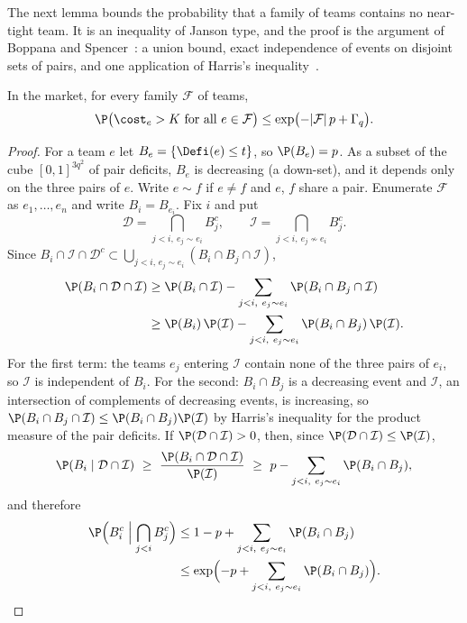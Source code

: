 The next lemma bounds the probability that a family of teams contains no near-tight team. It
is an inequality of Janson type, and the proof is the argument of Boppana and
Spencer~\cite{BoppanaSpencer89}: a union bound, exact independence of events on disjoint sets
of pairs, and one application of Harris's inequality~\cite{Harris60}.

\begin{lemma}\label{lem:transfer-void}
In the market, for every family $\mathcal F$ of teams,
\[
\P\bigl(\cost_e>K\ \text{for all }e\in\mathcal F\bigr)\le\exp\bigl(-|\mathcal F|\,p+\Gamma_q\bigr).
\]
\end{lemma}

\begin{proof}
For a team $e$ let $B_e=\{\Defi(e)\le t\}$, so $\P(B_e)=p$. As a subset of the cube
$[0,1]^{3q^2}$ of pair deficits, $B_e$ is decreasing (a down-set), and it depends only on the
three pairs of $e$. Write $e\sim f$ if $e\ne f$ and $e$, $f$ share a pair. Enumerate
$\mathcal F$ as $e_1,\dots,e_n$ and write $B_i=B_{e_i}$. Fix $i$ and put
\[
\mathcal D=\bigcap_{j<i,\ e_j\sim e_i}B_j^{c},\qquad
\mathcal I=\bigcap_{j<i,\ e_j\not\sim e_i}B_j^{c}.
\]
Since $B_i\cap\mathcal I\cap\mathcal D^{c}\subset\bigcup_{j<i,\,e_j\sim e_i}(B_i\cap B_j\cap\mathcal I)$,
\begin{align*}
\P(B_i\cap\mathcal D\cap\mathcal I)
&\ge\P(B_i\cap\mathcal I)-\sum_{j<i,\ e_j\sim e_i}\P(B_i\cap B_j\cap\mathcal I)\\
&\ge\P(B_i)\,\P(\mathcal I)-\sum_{j<i,\ e_j\sim e_i}\P(B_i\cap B_j)\,\P(\mathcal I).
\end{align*}
For the first term: the teams $e_j$ entering $\mathcal I$ contain none of the three pairs of
$e_i$, so $\mathcal I$ is independent of $B_i$. For the second: $B_i\cap B_j$ is a decreasing
event and $\mathcal I$, an intersection of complements of decreasing events, is increasing, so
$\P(B_i\cap B_j\cap\mathcal I)\le\P(B_i\cap B_j)\P(\mathcal I)$ by Harris's inequality for the
product measure of the pair deficits. If $\P(\mathcal D\cap\mathcal I)>0$, then, since
$\P(\mathcal D\cap\mathcal I)\le\P(\mathcal I)$,
\[
\P(B_i\mid\mathcal D\cap\mathcal I)\ \ge\ \frac{\P(B_i\cap\mathcal D\cap\mathcal I)}{\P(\mathcal I)}
\ \ge\ p-\sum_{j<i,\ e_j\sim e_i}\P(B_i\cap B_j),
\]
and therefore
\begin{align*}
\P\Bigl(B_i^{c}\Bigm|\bigcap_{j<i}B_j^{c}\Bigr)&\le1-p+\sum_{j<i,\ e_j\sim e_i}\P(B_i\cap B_j)\\
&\le\exp\Bigl(-p+\sum_{j<i,\ e_j\sim e_i}\P(B_i\cap B_j)\Bigr).

\end{align*}
\end{proof}
